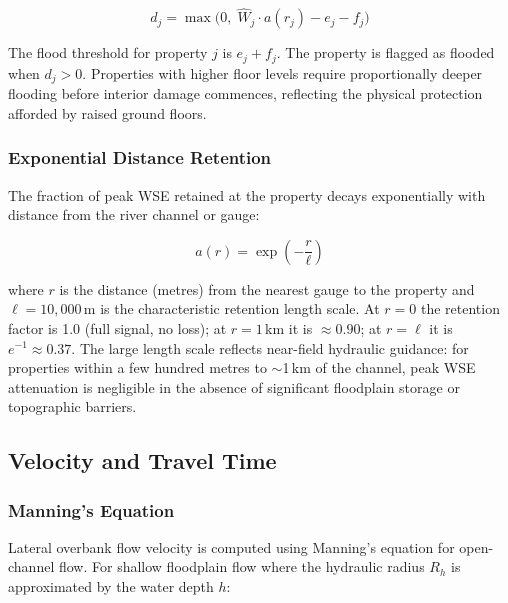 \documentclass[11pt,a4paper]{article}
\begin{document}
\begin{equation}
    d_j = \max\!\big(0, \; \hat{W}_j \cdot a(r_j) - e_j - f_j\big)
    \label{eq:eff_depth}
\end{equation}

\noindent The flood threshold for property $j$ is $e_j + f_j$. The property is
flagged as flooded when $d_j > 0$. Properties with higher floor levels require
proportionally deeper flooding before interior damage commences, reflecting the
physical protection afforded by raised ground floors.

\subsubsection{Exponential Distance Retention}
\label{sec:attenuation}

The fraction of peak WSE retained at the property decays exponentially with
distance from the river channel or gauge:

\begin{equation}
    a(r) = \exp\!\left(-\frac{r}{\ell}\right)
    \label{eq:attenuation}
\end{equation}

\noindent where $r$ is the distance (metres) from the nearest gauge to the property
and $\ell = 10{,}000\,$m is the characteristic retention length scale. At $r = 0$
the retention factor is 1.0 (full signal, no loss); at $r = 1\,$km it is $\approx 0.90$;
at $r = \ell$ it is $e^{-1} \approx 0.37$. The large length scale reflects
near-field hydraulic guidance: for properties within a few hundred metres to
$\sim$1\,km of the channel, peak WSE attenuation is negligible in the absence
of significant floodplain storage or topographic barriers.

\subsection{Velocity and Travel Time}
\label{sec:velocity}

\subsubsection{Manning's Equation}

Lateral overbank flow velocity is computed using Manning's equation for open-channel
flow. For shallow floodplain flow where the hydraulic radius $R_h$ is approximated
by the water depth $h$:
\end{document}
